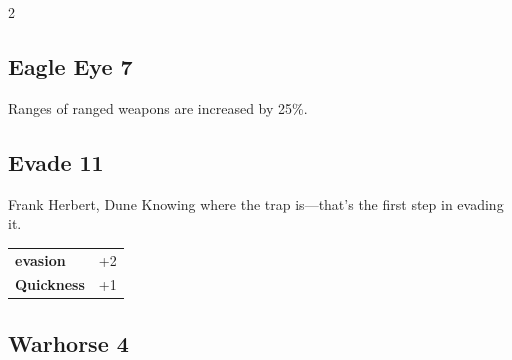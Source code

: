 \begin{multicols}{2}
\begin{tcolorbox}
\vspace{3mm}



\end{tcolorbox}

\begin{tcolorbox}
    \subsection*{Eagle Eye \hfill \small{7 }}
    \tcblower
Ranges of ranged weapons are increased by 25\%.


\vspace{3mm}



\end{tcolorbox}

\begin{tcolorbox}
    \subsection*{Evade \hfill \small{11 }}
    \tcblower


\begin{pquote}{Frank Herbert, Dune}
Knowing where the trap is—that's the first step in evading it.
\end{pquote}

\vspace{3mm}

\begin{tabular}{@{}ll@{}}
    \textbf{evasion} & +2\\
    \textbf{Quickness} & +1\\
\end{tabular}


\end{tcolorbox}

\begin{tcolorbox}
    \subsection*{Warhorse \hfill \small{4 }}
    \tcblower





\end{tcolorbox}
\end{multicols}
